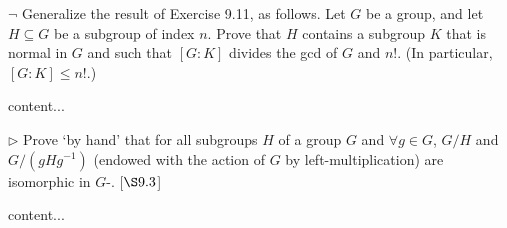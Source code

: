 \begin{exercise}
	$\neg$ Generalize the result of Exercise 9.11, as follows. Let $G$ be a group, and let $H\subseteq G$ be a subgroup of index $n$. Prove that $H$ contains a subgroup $K$ that is normal in $G$ and such that $[G:K]$ divides the gcd of $G$ and $n!$. (In particular, $[G: K] \leq n!$.)
\end{exercise}
\begin{solution}
	content...
\end{solution}

\begin{exercise}
	$\triangleright$ Prove `by hand' that for all subgroups $H$ of a group $G$ and $\forall g \in G$, $G/H$ and $G/(gHg^{-1})$ (endowed with the action of $G$ by left-multiplication) are isomorphic in $G$-. [$\S 9.3$]
\end{exercise}
\begin{solution}
	content...
\end{solution}

